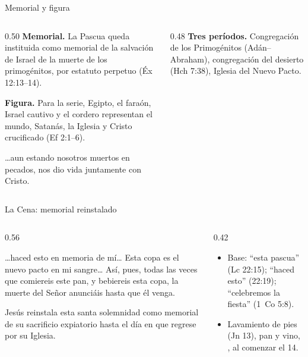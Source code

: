 \begin{frame}{Memorial y figura}
\begin{columns}[t,onlytextwidth]
\begin{column}{0.50\textwidth}\small\RaggedRight
\textbf{\textcolor{tierraroja}{Memorial.}} La Pascua queda instituida como memorial de la salvación de Israel de la muerte de los primogénitos, por estatuto perpetuo (Éx 12:13--14).\par\smallskip
\textbf{\textcolor{tierraroja}{Figura.}} Para la serie, Egipto, el faraón, Israel cautivo y el cordero representan el mundo, Satanás, la Iglesia y Cristo crucificado (Ef 2:1--6).
\begin{cita}\ldots{}aun estando nosotros muertos en pecados, nos dio vida juntamente con Cristo.\end{cita}
\end{column}
\begin{column}{0.48\textwidth}\small\RaggedRight
\textbf{\textcolor{tierraroja}{Tres períodos.}} Congregación de los Primogénitos (Adán--Abraham), congregación del desierto (Hch 7:38), Iglesia del Nuevo Pacto.\par\smallskip
{}
\end{column}
\end{columns}
\end{frame}

\begin{frame}{La Cena: memorial reinstalado}
\begin{columns}[c,onlytextwidth]
\begin{column}{0.56\textwidth}
\begin{cita}\ldots{}haced esto en memoria de mí\ldots{} Esta copa es el nuevo pacto en mi sangre\ldots{} Así, pues, todas las veces que comiereis este pan, y bebiereis esta copa, la muerte del Señor anunciáis hasta que él venga.\end{cita}
\scriptsize\RaggedRight Jesús reinstala esta santa solemnidad como memorial de su sacrificio expiatorio hasta el día en que regrese por su Iglesia.
\end{column}
\begin{column}{0.42\textwidth}\scriptsize
\begin{itemize}\scriptsize
\item Base: ``esta pascua'' (Lc 22:15); ``haced esto'' (22:19); ``celebremos la fiesta'' (1~Co 5:8).
\item Lavamiento de pies (Jn 13), pan y vino, , al comenzar el 14.
\end{itemize}
\end{column}
\end{columns}
\end{frame}

